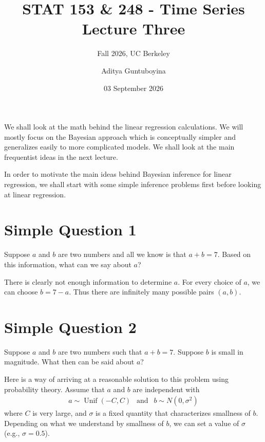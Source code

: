 \documentclass{scrartcl}
\begin{document}
\title{STAT 153 \& 248 - Time Series  \\
  Lecture Three} 
\subtitle{Fall 2026, UC Berkeley}
\author{Aditya Guntuboyina}

\date{03 September 2026}

\maketitle

We shall look at the math behind the linear regression
calculations. We will mostly focus on the Bayesian approach which is
conceptually simpler and generalizes easily to more complicated
models. We shall look at the main frequentist ideas in the next
lecture.

In order to motivate the main ideas behind Bayesian inference for
linear regression, we shall start with some simple inference problems
first before looking at linear regression.

\section{Simple Question 1}

Suppose $a$ and $b$ are two numbers and all we know is that $a + b =
7$. Based on this information, what can we say about $a$?

There is clearly not enough information to determine $a$. For every choice of
$a$, we can choose $b=7-a$. Thus there are infinitely many possible
pairs $(a,b)$.

\section{Simple Question 2}

Suppose $a$ and $b$ are two numbers such that $a + b = 7$. Suppose $b$
is small in magnitude. What then can be said about $a$?

Here is a way of arriving at a reasonable solution to this problem
using probability theory. Assume that $a$ and $b$ are independent
with
\begin{align}\label{md2}
  a \sim \operatorname{Unif}(-C,C) ~~ \text{ and } ~~
  b \sim N(0,\sigma^2)
\end{align}
where $C$ is very large, and $\sigma$ is a fixed quantity that
characterizes smallness of $b$. Depending on what we understand by
smallness of $b$, we can set a value of $\sigma$ (e.g., $\sigma =
0.5$).
\end{document}
